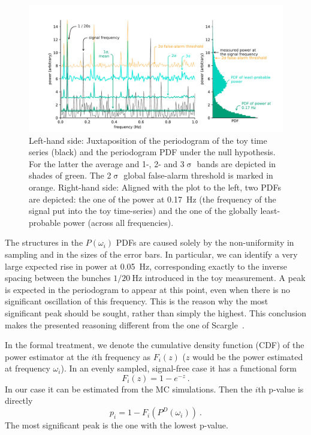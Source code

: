 \begin{figure}
  \centering \includegraphics[width=\linewidth]{gfx/axions/basic_detection.pdf}
  \caption{Left-hand side: Juxtaposition of the periodogram of the toy time series (black) and the periodogram PDF under the null hypothesis. For the latter the average and 1-, 2- and 3$\upsigma$ bands are depicted in shades of green. The 2$\upsigma$ global false-alarm threshold is marked in orange. Right-hand side: Aligned with the plot to the left, two PDFs are depicted: the one of the power at \SI{0.17}{\hertz} (the frequency of the signal put into the toy time-series) and the one of the globally least-probable power (across all frequencies).}\label{fig:basic_detection}
\end{figure}

The structures in the $P(\omega_i)$ PDFs are caused solely by the non-uniformity in sampling and in the sizes of the error bars. In particular, we can identify a very large expected rise in power at \SI{0.05}{\hertz}, corresponding exactly to the inverse spacing between the bunches $1 / \SI{20}{\hertz}$ introduced in the toy measurement. A peak is expected in the periodogram to appear at this point, even when there is no significant oscillation of this frequency. This is the reason why the most significant peak should be sought, rather than simply the highest. This conclusion makes the presented reasoning different from the one of Scargle~\cite{Scargle1982}.

In the formal treatment, we denote the cumulative density function (CDF) of the power estimator at the $i$th frequency as $F_i(z)$ ($z$ would be the power estimated at frequency $\omega_i$). In an evenly sampled, signal-free case it has a functional form
\begin{equation}
  \label{eq:local_functional_form}
  F_i(z) = 1 - e^{-z} \ .
\end{equation}
In our case it can be estimated from the MC simulations. Then the $i$th p-value is directly
\begin{equation} \label{eq:local_p_value}
  p_i = 1 - F_i\left( P^D(\omega_i) \right) \ .
\end{equation}
The most significant peak is the one with the lowest p-value.

